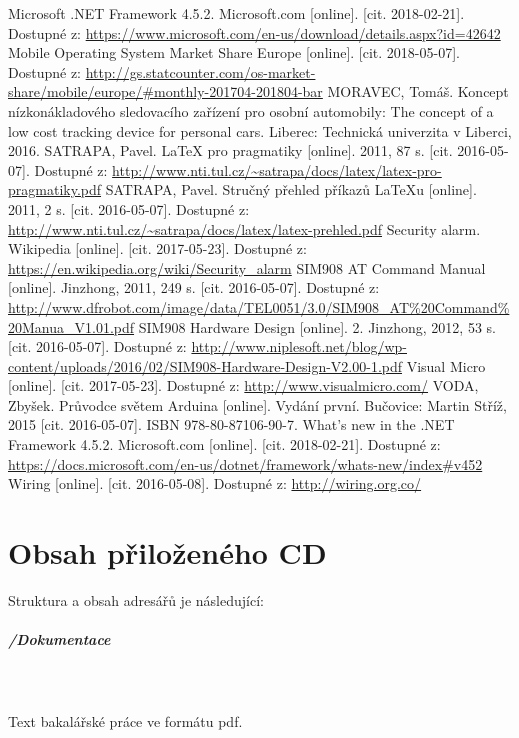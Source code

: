 \documentclass[FM,DP]{tulthesis}  %
\begin{document}
\begin{thebibliography}{10}
Microsoft .NET Framework 4.5.2. Microsoft.com [online]. [cit. 2018-02-21]. Dostupné z: \url{https://www.microsoft.com/en-us/download/details.aspx?id=42642}
Mobile Operating System Market Share Europe [online]. [cit. 2018-05-07]. Dostupné z: \url{http://gs.statcounter.com/os-market-share/mobile/europe/#monthly-201704-201804-bar}
MORAVEC, Tomáš. Koncept nízkonákladového sledovacího zařízení pro osobní automobily: The concept of a low cost tracking device for personal cars. Liberec: Technická univerzita v Liberci, 2016.
SATRAPA, Pavel. LaTeX pro pragmatiky [online]. 2011, 87 s. [cit. 2016-05-07]. Dostupné z: \url{http://www.nti.tul.cz/~satrapa/docs/latex/latex-pro-pragmatiky.pdf}
SATRAPA, Pavel. Stručný přehled příkazů LaTeXu [online]. 2011, 2 s. [cit. 2016-05-07]. Dostupné z: \url{http://www.nti.tul.cz/~satrapa/docs/latex/latex-prehled.pdf}
Security alarm. Wikipedia [online]. [cit. 2017-05-23]. Dostupné z: \url{https://en.wikipedia.org/wiki/Security_alarm}
SIM908 AT Command Manual [online]. Jinzhong, 2011, 249 s. [cit. 2016-05-07]. Dostupné z: \url{http://www.dfrobot.com/image/data/TEL0051/3.0/SIM908\_AT\%20Command\%20Manua\_V1.01.pdf}
SIM908 Hardware Design [online]. 2. Jinzhong, 2012, 53 s. [cit. 2016-05-07]. Dostupné z: \url{http://www.niplesoft.net/blog/wp-content/uploads/2016/02/SIM908-Hardware-Design-V2.00-1.pdf}
Visual Micro [online]. [cit. 2017-05-23]. Dostupné z: \url{http://www.visualmicro.com/}
VODA, Zbyšek. Průvodce světem Arduina [online]. Vydání první. Bučovice: Martin Stříž, 2015 [cit. 2016-05-07]. ISBN 978-80-87106-90-7.
What's new in the .NET Framework 4.5.2. Microsoft.com [online]. [cit. 2018-02-21]. Dostupné z: \url{https://docs.microsoft.com/en-us/dotnet/framework/whats-new/index#v452}
Wiring [online]. [cit. 2016-05-08]. Dostupné z: \url{http://wiring.org.co/}
\end{thebibliography}


\appendix

\chapter{Obsah přiloženého CD}
Struktura a obsah adresářů je následující:

\paragraph{/Dokumentace}\mbox{}\\\mbox{}\\
Text bakalářské práce ve formátu pdf.
\end{document}
